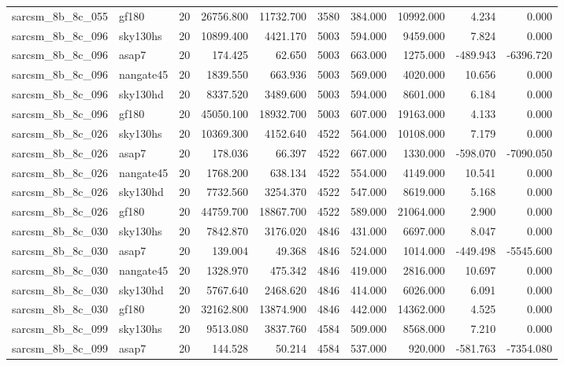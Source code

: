 \documentclass{article}
\begin{document}
\begin{longtable}{llrrrrrrrr}
sarcsm\_8b\_8c\_055 & gf180 & 20 & 26756.800 & 11732.700 & 3580 & 384.000 & 10992.000 & 4.234 & 0.000 \\
sarcsm\_8b\_8c\_096 & sky130hs & 20 & 10899.400 & 4421.170 & 5003 & 594.000 & 9459.000 & 7.824 & 0.000 \\
sarcsm\_8b\_8c\_096 & asap7 & 20 & 174.425 & 62.650 & 5003 & 663.000 & 1275.000 & -489.943 & -6396.720 \\
sarcsm\_8b\_8c\_096 & nangate45 & 20 & 1839.550 & 663.936 & 5003 & 569.000 & 4020.000 & 10.656 & 0.000 \\
sarcsm\_8b\_8c\_096 & sky130hd & 20 & 8337.520 & 3489.600 & 5003 & 594.000 & 8601.000 & 6.184 & 0.000 \\
sarcsm\_8b\_8c\_096 & gf180 & 20 & 45050.100 & 18932.700 & 5003 & 607.000 & 19163.000 & 4.133 & 0.000 \\
sarcsm\_8b\_8c\_026 & sky130hs & 20 & 10369.300 & 4152.640 & 4522 & 564.000 & 10108.000 & 7.179 & 0.000 \\
sarcsm\_8b\_8c\_026 & asap7 & 20 & 178.036 & 66.397 & 4522 & 667.000 & 1330.000 & -598.070 & -7090.050 \\
sarcsm\_8b\_8c\_026 & nangate45 & 20 & 1768.200 & 638.134 & 4522 & 554.000 & 4149.000 & 10.541 & 0.000 \\
sarcsm\_8b\_8c\_026 & sky130hd & 20 & 7732.560 & 3254.370 & 4522 & 547.000 & 8619.000 & 5.168 & 0.000 \\
sarcsm\_8b\_8c\_026 & gf180 & 20 & 44759.700 & 18867.700 & 4522 & 589.000 & 21064.000 & 2.900 & 0.000 \\
sarcsm\_8b\_8c\_030 & sky130hs & 20 & 7842.870 & 3176.020 & 4846 & 431.000 & 6697.000 & 8.047 & 0.000 \\
sarcsm\_8b\_8c\_030 & asap7 & 20 & 139.004 & 49.368 & 4846 & 524.000 & 1014.000 & -449.498 & -5545.600 \\
sarcsm\_8b\_8c\_030 & nangate45 & 20 & 1328.970 & 475.342 & 4846 & 419.000 & 2816.000 & 10.697 & 0.000 \\
sarcsm\_8b\_8c\_030 & sky130hd & 20 & 5767.640 & 2468.620 & 4846 & 414.000 & 6026.000 & 6.091 & 0.000 \\
sarcsm\_8b\_8c\_030 & gf180 & 20 & 32162.800 & 13874.900 & 4846 & 442.000 & 14362.000 & 4.525 & 0.000 \\
sarcsm\_8b\_8c\_099 & sky130hs & 20 & 9513.080 & 3837.760 & 4584 & 509.000 & 8568.000 & 7.210 & 0.000 \\
sarcsm\_8b\_8c\_099 & asap7 & 20 & 144.528 & 50.214 & 4584 & 537.000 & 920.000 & -581.763 & -7354.080 \\

\end{longtable}
\end{document}
